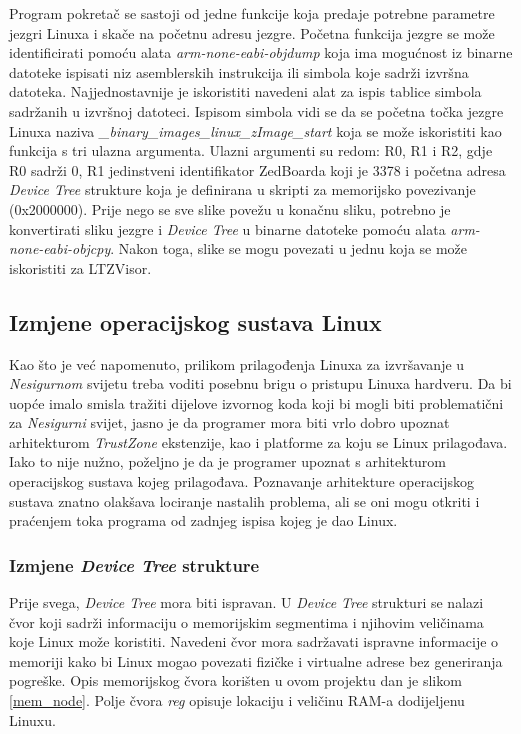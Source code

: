 \documentclass[times, utf8, diplomski, numeric]{fer}
\begin{document}
Program pokretač se sastoji od jedne funkcije koja predaje potrebne parametre jezgri Linuxa i skače na početnu adresu jezgre.
Početna funkcija jezgre se može identificirati pomoću alata \textit{arm-none-eabi-objdump} koja ima mogućnost iz binarne
datoteke ispisati niz asemblerskih instrukcija ili simbola koje sadrži izvršna datoteka. Najjednostavnije je iskoristiti
navedeni alat za ispis tablice simbola sadržanih u izvršnoj datoteci. Ispisom simbola vidi se da se početna točka jezgre
Linuxa naziva \textit{\_binary\_images\_linux\_zImage\_start} koja se može iskoristiti kao funkcija s tri ulazna argumenta.
Ulazni argumenti su redom: R0, R1 i R2, gdje R0 sadrži 0, R1 jedinstveni identifikator ZedBoarda koji je 3378 i početna adresa
\textit{Device Tree} strukture koja je definirana u skripti za memorijsko povezivanje (0x2000000). Prije nego se sve slike
povežu u konačnu sliku, potrebno je konvertirati sliku jezgre i \textit{Device Tree} u binarne datoteke pomoću alata
\textit{arm-none-eabi-objcpy}. Nakon toga, slike se mogu povezati u jednu koja se može iskoristiti za LTZVisor.

\subsection{Izmjene operacijskog sustava Linux}
Kao što je već napomenuto, prilikom prilagođenja Linuxa za izvršavanje u \textit{Nesigurnom} svijetu treba voditi posebnu brigu o
pristupu Linuxa hardveru. Da bi uopće imalo smisla tražiti dijelove izvornog koda koji bi mogli biti problematični za
\textit{Nesigurni} svijet, jasno je da programer mora biti vrlo dobro upoznat arhitekturom \textit{TrustZone} ekstenzije, kao i
platforme za koju se Linux prilagođava. Iako to nije nužno, poželjno je da je programer upoznat s arhitekturom operacijskog
sustava kojeg prilagođava. Poznavanje arhitekture operacijskog sustava znatno olakšava lociranje nastalih problema, ali se
oni mogu otkriti i praćenjem toka programa od zadnjeg ispisa kojeg je dao Linux.

\subsubsection{Izmjene \textit{Device Tree} strukture}
Prije svega, \textit{Device Tree} mora biti ispravan. U \textit{Device Tree} strukturi se nalazi čvor koji sadrži informaciju
o memorijskim segmentima i njihovim veličinama koje Linux može koristiti. Navedeni čvor mora sadržavati ispravne informacije
o memoriji kako bi Linux mogao povezati fizičke i virtualne adrese bez generiranja pogreške. Opis memorijskog čvora korišten
u ovom projektu dan je slikom \ref{mem_node}. Polje čvora \textit{reg} opisuje lokaciju i veličinu RAM-a dodijeljenu Linuxu.
\end{document}
